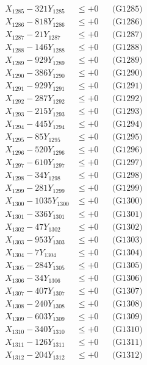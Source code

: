 \documentclass[a4paper,10pt]{article}
\begin{document}
{\begin{align}
X_{1285} - 321Y_{1285} &\leq +0 && \text{(G1285)} \\
X_{1286} - 818Y_{1286} &\leq +0 && \text{(G1286)} \\
X_{1287} - 21Y_{1287} &\leq +0 && \text{(G1287)} \\
X_{1288} - 146Y_{1288} &\leq +0 && \text{(G1288)} \\
X_{1289} - 929Y_{1289} &\leq +0 && \text{(G1289)} \\
X_{1290} - 386Y_{1290} &\leq +0 && \text{(G1290)} \\
\allowbreak
X_{1291} - 929Y_{1291} &\leq +0 && \text{(G1291)} \\
X_{1292} - 287Y_{1292} &\leq +0 && \text{(G1292)} \\
X_{1293} - 215Y_{1293} &\leq +0 && \text{(G1293)} \\
X_{1294} - 445Y_{1294} &\leq +0 && \text{(G1294)} \\
X_{1295} - 85Y_{1295} &\leq +0 && \text{(G1295)} \\
X_{1296} - 520Y_{1296} &\leq +0 && \text{(G1296)} \\
X_{1297} - 610Y_{1297} &\leq +0 && \text{(G1297)} \\
X_{1298} - 34Y_{1298} &\leq +0 && \text{(G1298)} \\
X_{1299} - 281Y_{1299} &\leq +0 && \text{(G1299)} \\
X_{1300} - 1035Y_{1300} &\leq +0 && \text{(G1300)} \\
\allowbreak
X_{1301} - 336Y_{1301} &\leq +0 && \text{(G1301)} \\
X_{1302} - 47Y_{1302} &\leq +0 && \text{(G1302)} \\
X_{1303} - 953Y_{1303} &\leq +0 && \text{(G1303)} \\
X_{1304} - 7Y_{1304} &\leq +0 && \text{(G1304)} \\
X_{1305} - 284Y_{1305} &\leq +0 && \text{(G1305)} \\
X_{1306} - 34Y_{1306} &\leq +0 && \text{(G1306)} \\
X_{1307} - 407Y_{1307} &\leq +0 && \text{(G1307)} \\
X_{1308} - 240Y_{1308} &\leq +0 && \text{(G1308)} \\
X_{1309} - 603Y_{1309} &\leq +0 && \text{(G1309)} \\
X_{1310} - 340Y_{1310} &\leq +0 && \text{(G1310)} \\
\allowbreak
X_{1311} - 126Y_{1311} &\leq +0 && \text{(G1311)} \\
X_{1312} - 204Y_{1312} &\leq +0 && \text{(G1312)} \\

\end{align}}
\end{document}
